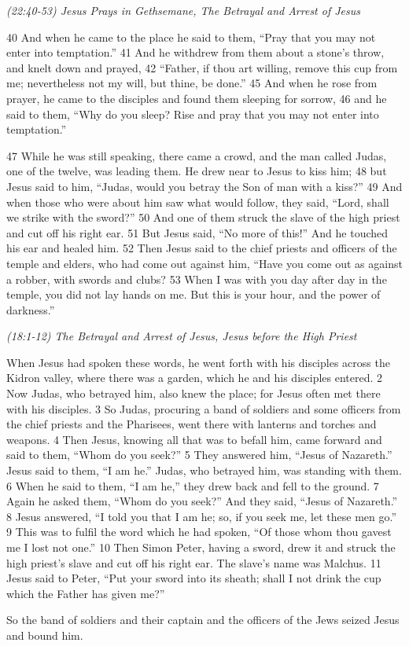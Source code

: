\documentclass[letterpaper]{report}
\begin{document}
{\centering
	\emph{(22:40-53) Jesus Prays in Gethsemane, The Betrayal and Arrest of Jesus}\\
}
\begin{multicols}{2}
40 And when he came to the place he said to them, “Pray that you may not enter into temptation.” 41 And he withdrew from them about a stone’s throw, and knelt down and prayed, 42 “Father, if thou art willing, remove this cup from me; nevertheless not my will, but thine, be done.” 45 And when he rose from prayer, he came to the disciples and found them sleeping for sorrow, 46 and he said to them, “Why do you sleep? Rise and pray that you may not enter into temptation.”

47 While he was still speaking, there came a crowd, and the man called Judas, one of the twelve, was leading them. He drew near to Jesus to kiss him; 48 but Jesus said to him, “Judas, would you betray the Son of man with a kiss?” 49 And when those who were about him saw what would follow, they said, “Lord, shall we strike with the sword?” 50 And one of them struck the slave of the high priest and cut off his right ear. 51 But Jesus said, “No more of this!” And he touched his ear and healed him. 52 Then Jesus said to the chief priests and officers of the temple and elders, who had come out against him, “Have you come out as against a robber, with swords and clubs? 53 When I was with you day after day in the temple, you did not lay hands on me. But this is your hour, and the power of darkness.”
\end{multicols}

{\centering
	\emph{(18:1-12) The Betrayal and Arrest of Jesus, Jesus before the High Priest}\\
}
\begin{multicols}{2}
	When Jesus had spoken these words, he went forth with his disciples across the Kidron valley, where there was a garden, which he and his disciples entered. 2 Now Judas, who betrayed him, also knew the place; for Jesus often met there with his disciples. 3 So Judas, procuring a band of soldiers and some officers from the chief priests and the Pharisees, went there with lanterns and torches and weapons. 4 Then Jesus, knowing all that was to befall him, came forward and said to them, “Whom do you seek?” 5 They answered him, “Jesus of Nazareth.” Jesus said to them, “I am he.” Judas, who betrayed him, was standing with them. 6 When he said to them, “I am he,” they drew back and fell to the ground. 7 Again he asked them, “Whom do you seek?” And they said, “Jesus of Nazareth.” 8 Jesus answered, “I told you that I am he; so, if you seek me, let these men go.” 9 This was to fulfil the word which he had spoken, “Of those whom thou gavest me I lost not one.” 10 Then Simon Peter, having a sword, drew it and struck the high priest’s slave and cut off his right ear. The slave’s name was Malchus. 11 Jesus said to Peter, “Put your sword into its sheath; shall I not drink the cup which the Father has given me?”
	
	 So the band of soldiers and their captain and the officers of the Jews seized Jesus and bound him.
\end{multicols}
\end{document}
